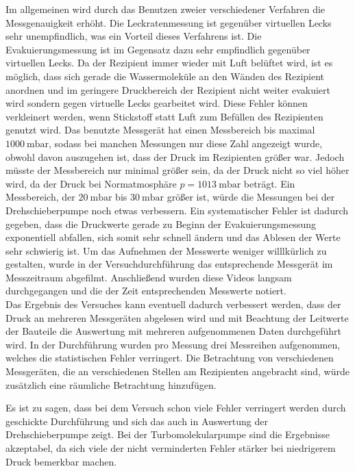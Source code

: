 \noindent Im allgemeinen wird durch das Benutzen zweier verschiedener Verfahren die Messgenauigkeit erhöht. Die Leckratenmessung ist gegenüber virtuellen Lecks sehr unempfindlich, was 
ein Vorteil dieses Verfahrens ist. 
Die Evakuierungsmessung ist im Gegensatz dazu sehr empfindlich gegenüber virtuellen Lecks. Da der Rezipient immer wieder mit Luft belüftet wird, ist es möglich, dass sich gerade die Wassermoleküle 
an den Wänden des Rezipient anordnen und im geringere Druckbereich der Rezipient nicht weiter evakuiert wird sondern gegen virtuelle Lecks gearbeitet wird. 
Diese Fehler können verkleinert werden, wenn Stickstoff statt Luft zum Befüllen des Rezipienten genutzt wird. 
Das benutzte Messgerät hat einen Messbereich bis maximal $\SI{1000}{\milli\bar}$, sodass bei manchen Messungen nur diese Zahl angezeigt wurde, obwohl davon auszugehen ist, dass der Druck 
im Rezipienten größer war. Jedoch müsste der Messbereich nur minimal größer sein, da der Druck nicht so viel höher wird, da der Druck bei Normatmosphäre $p = \SI{1013}{\milli\bar}$ beträgt. 
Ein Messbereich, der $\SI{20}{\milli\bar}$ bis $\SI{30}{\milli\bar}$ größer ist, würde die Messungen bei der Drehschieberpumpe noch etwas verbessern. 
Ein systematischer Fehler ist dadurch gegeben, dass die Druckwerte gerade zu Beginn der Evakuierungsmessung exponentiell abfallen, sich somit sehr schnell ändern und das Ablesen der Werte 
sehr schwierig ist. Um das Aufnehmen der Messwerte weniger willlkürlich zu gestalten, wurde in der Versuchdurchführung das entsprechende Messgerät im Messzeitraum abgefilmt. Anschließend 
wurden diese Videos langsam durchgegangen und die der Zeit entsprechenden Messwerte notiert. \\
Das Ergebnis des Versuches kann eventuell dadurch verbessert werden, dass der Druck an mehreren Messgeräten abgelesen wird und mit Beachtung der Leitwerte der Bauteile die Auswertung mit 
mehreren aufgenommenen Daten durchgeführt wird. In der Durchführung wurden pro Messung drei Messreihen aufgenommen, welches die statistischen Fehler verringert. Die Betrachtung von 
verschiedenen Messgeräten, die an verschiedenen Stellen am Rezipienten angebracht sind, würde zusätzlich eine räumliche Betrachtung hinzufügen. 

\noindent Es ist zu sagen, dass bei dem Versuch schon viele Fehler verringert werden durch geschickte Durchführung und sich das auch in Auswertung der Drehschieberpumpe zeigt. Bei der 
Turbomolekularpumpe sind die Ergebnisse akzeptabel, da sich viele der nicht verminderten Fehler stärker bei niedrigerem Druck bemerkbar machen. 